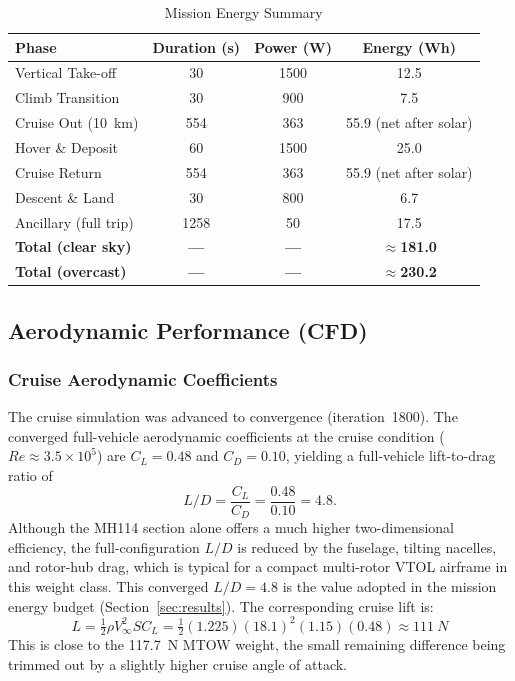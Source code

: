 \documentclass[conference]{IEEEtran}
\begin{document}
\begin{table}[htbp]
\centering
\caption{Mission Energy Summary}
\label{tab:energy}
\renewcommand{\arraystretch}{1.3}
\begin{tabular}{lccc}
\toprule
\textbf{Phase} & \textbf{Duration (s)} & \textbf{Power (W)} & \textbf{Energy (Wh)} \\
\midrule
Vertical Take-off      & 30   & 1500 & 12.5 \\
Climb Transition       & 30   & 900  & 7.5  \\
Cruise Out (\SI{10}{km}) & 554 & 363  & 55.9 (net after solar) \\
Hover \& Deposit       & 60   & 1500 & 25.0 \\
Cruise Return          & 554  & 363  & 55.9 (net after solar) \\
Descent \& Land        & 30   & 800  & 6.7  \\
Ancillary (full trip)  & 1258 & 50   & 17.5 \\
\midrule
\textbf{Total (clear sky)} & \textbf{—} & \textbf{—} & \textbf{$\approx$181.0} \\
\textbf{Total (overcast)}  & \textbf{—} & \textbf{—} & \textbf{$\approx$230.2} \\
\bottomrule
\end{tabular}
\end{table}

\subsection{Aerodynamic Performance (CFD)}
\label{sec:cfd}

\subsubsection{Cruise Aerodynamic Coefficients}

The cruise simulation was advanced to convergence (iteration~1800). The
converged full-vehicle aerodynamic coefficients at the cruise condition
($Re \approx 3.5 \times 10^5$) are $C_L = 0.48$ and $C_D = 0.10$, yielding a
full-vehicle lift-to-drag ratio of
\[
L/D = \frac{C_L}{C_D} = \frac{0.48}{0.10} = 4.8 .
\]
Although the MH114 section alone offers a much higher two-dimensional
efficiency, the full-configuration $L/D$ is reduced by the fuselage, tilting
nacelles, and rotor-hub drag, which is typical for a compact multi-rotor VTOL
airframe in this weight class. This converged $L/D = 4.8$ is the value adopted
in the mission energy budget (Section~\ref{sec:results}).
The corresponding cruise lift is:
\[
L = \tfrac{1}{2} \rho V_\infty^2 S C_L
  = \tfrac{1}{2}(1.225)(18.1)^2(1.15)(0.48) \approx \SI{111}{N}
\]
This is close to the \SI{117.7}{N} MTOW weight, the small remaining difference
being trimmed out by a slightly higher cruise angle of attack.
\end{document}
